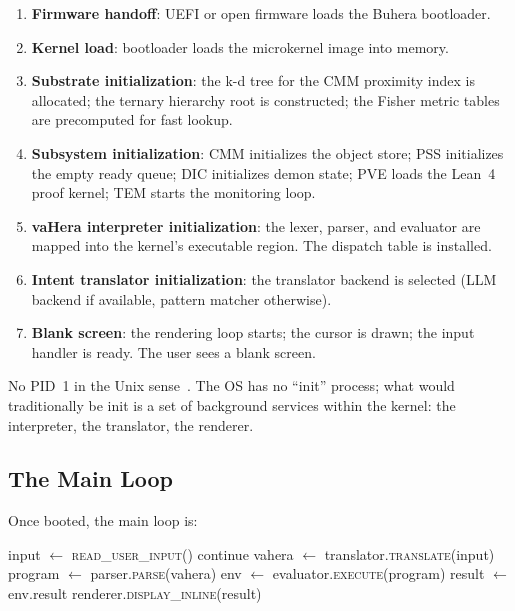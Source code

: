 \documentclass[11pt,twocolumn,a4paper]{article}
\begin{document}
\begin{enumerate}[leftmargin=*]
\item \textbf{Firmware handoff}: UEFI or open firmware loads the Buhera bootloader.
\item \textbf{Kernel load}: bootloader loads the microkernel image into memory.
\item \textbf{Substrate initialization}: the k-d tree for the CMM proximity index is allocated; the ternary hierarchy root is constructed; the Fisher metric tables are precomputed for fast lookup.
\item \textbf{Subsystem initialization}: CMM initializes the object store; PSS initializes the empty ready queue; DIC initializes demon state; PVE loads the Lean~4 proof kernel; TEM starts the monitoring loop.
\item \textbf{vaHera interpreter initialization}: the lexer, parser, and evaluator are mapped into the kernel's executable region. The dispatch table is installed.
\item \textbf{Intent translator initialization}: the translator backend is selected (LLM backend if available, pattern matcher otherwise).
\item \textbf{Blank screen}: the rendering loop starts; the cursor is drawn; the input handler is ready. The user sees a blank screen.
\end{enumerate}

No PID~1 in the Unix sense~\cite{ritchie1974unix}. The OS has no ``init'' process; what would traditionally be init is a set of background services within the kernel: the interpreter, the translator, the renderer.

\subsection{The Main Loop}

Once booted, the main loop is:

\begin{algorithm}[H]
\caption{Buhera main loop}
\begin{algorithmic}[1]
\Loop
  \State input $\leftarrow$ \textsc{read\_user\_input}()
    \State continue
  \EndIf
  \State vahera $\leftarrow$ translator.\textsc{translate}(input)
  \State program $\leftarrow$ parser.\textsc{parse}(vahera)
  \State env $\leftarrow$ evaluator.\textsc{execute}(program)
  \State result $\leftarrow$ env.result
  \State renderer.\textsc{display\_inline}(result)
\EndLoop
\end{algorithmic}
\end{algorithm}
\end{document}
